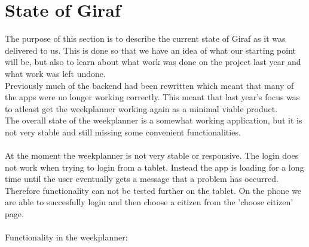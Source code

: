 \section{State of Giraf}
The purpose of this section is to describe the current state of Giraf as it was delivered to us. 
This is done so that we have an idea of what our starting point will be,
but also to learn about what work was done on the project last year and what work was left undone. 
\\
Previously much of the backend had been rewritten which meant that many of the apps were no longer working correctly. 
This meant that last year's focus was to atleast get the weekplanner working again as a minimal viable product.
\\
The overall state of the weekplanner is a somewhat working application, but it is not very stable and still missing some convenient functionalities.
\\\\
At the moment the weekplanner is not very stable or responsive. The login does not work when trying to login from a tablet. 
Instead the app is loading for a long time until the user eventually gets a message that a problem has occurred. 
Therefore functionality can not be tested further on the tablet. 
On the phone we are able to succesfully login and then choose a citizen from the 'choose citizen' page.
\\\\
Functionality in the weekplanner:
